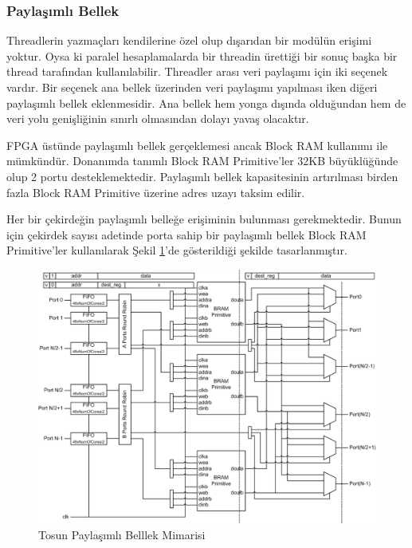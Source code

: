 \subsubsection{Paylaşımlı Bellek}
Threadlerin yazmaçları kendilerine özel olup dışarıdan bir modülün erişimi yoktur. Oysa ki paralel hesaplamalarda bir threadin ürettiği bir sonuç başka bir thread tarafından kullanılabilir. Threadler arası veri paylaşımı için iki seçenek vardır. Bir seçenek ana bellek üzerinden veri paylaşımı yapılması iken diğeri paylaşımlı bellek eklenmesidir. Ana bellek hem yonga dışında olduğundan hem de veri yolu genişliğinin sınırlı olmasından dolayı yavaş olacaktır.\par
FPGA üstünde paylaşımlı bellek gerçeklemesi ancak Block RAM kullanımı ile mümkündür. Donanımda tanımlı Block RAM Primitive'ler 32KB büyüklüğünde olup 2 portu desteklemektedir. Paylaşımlı bellek kapasitesinin artırılması birden fazla Block RAM Primitive üzerine adres uzayı taksim edilir.\par
Her bir çekirdeğin paylaşımlı belleğe erişiminin bulunması gerekmektedir. Bunun için çekirdek sayısı adetinde porta sahip bir paylaşımlı bellek Block RAM Primitive'ler kullanılarak Şekil \ref{image:sharedMemory}'de gösterildiği şekilde tasarlanmıştır.
\begin{figure}
\centering
\shorthandoff{=}
\includegraphics[width=\textwidth]{gorsel/sharedMemory.png}
\shorthandoff{=}
\caption{Tosun Paylaşımlı Belllek Mimarisi}
\label{image:sharedMemory}
\end{figure}

